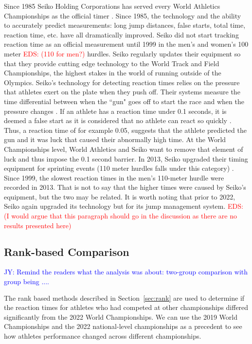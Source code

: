 \documentclass[12pt, letterpaper, titlepage]{article}
\newcommand{\jy}[1]{\textcolor{blue}{JY: #1}}
\newcommand{\eds}[1]{\textcolor{red}{EDS: (#1)}}
\begin{document}

Since 1985 Seiko Holding Corporations has served every World Athletics 
Championships as the official timer \citep{wa2022seiko}.  Since 1985, the 
technology and the ability
to accurately predict measurements: long jump distances, false starts, total 
time, reaction time, etc. have all dramatically improved.  Seiko did not start 
tracking reaction time as an official measurement until 1999 in the men's and 
women's 100 meter \eds{110 for men?} hurdles. 
Seiko regularly updates their equipment so that they provide cutting edge
technology to the World Track and Field Championships, the highest stakes in the 
world of running outside of the Olympics. Seiko's technology for detecting 
reaction times relies on the pressure that athletes exert on the plate when they 
push off.  Their systems measure the time differential
between when the ``gun" goes off to start the race and when the pressure changes 
\citep{wa2022seiko}.  If an athlete has a reaction time under 0.1 seconds, it 
is deemed a 
false start as it is considered that no athlete can react so quickly 
\citep{Seiko-Timing}.  Thus, a reaction time of for example 0.05, suggests that 
the athlete predicted the gun and it was luck that caused their abnormally high 
time.  At the World Championships level, World Athletics and Seiko want to remove 
that element of luck and thus impose the 0.1 second barrier. In 2013, Seiko 
upgraded their timing equipment for sprinting events (110 meter hurdles falls 
under this category) \citep{wa2013backtage}. Since 1999, the
slowest reaction 
times in the men's 110-meter hurdle were recorded in 2013.  That is not to say
 that the higher 
times were caused by Seiko's equipment, but the two may be related.  It is worth 
noting that prior
to 2022, Seiko again upgraded its technology but for its jump management system.
\eds{I would argue that this paragraph should go in the discussion as there are 
no results presented here}

\subsection{Rank-based Comparison} \label{subsec:Results_Rank}

\jy{Remind the readers what the analysis was about: two-group comparison with
  group being ....}

The rank based methods described in Section~\ref{sec:rank} are used
to determine if the reaction times for athletes who had competed at other 
championships differed significantly from the 2022 World Championships.  We can
use the 2019 World Championships and the 2022 national-level championships as a 
precedent to see how athletes performance changed across different championships.
\end{document}
